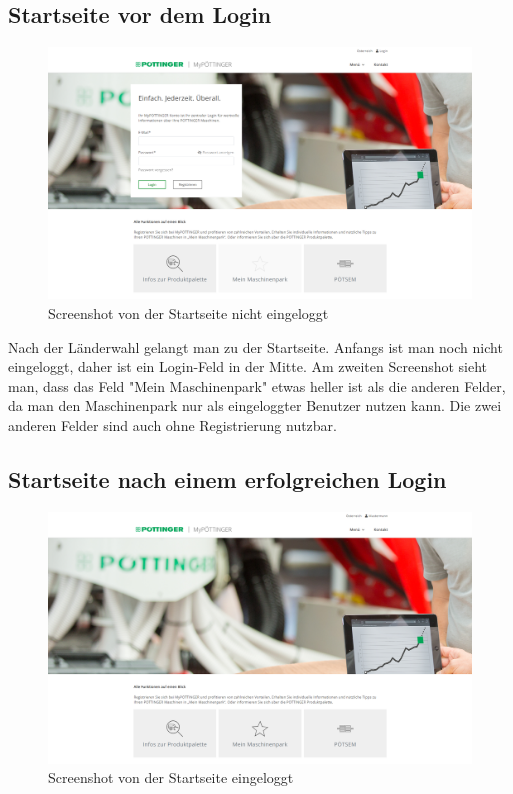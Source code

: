 \subsection{Startseite vor dem Login}
\begin{figure}[H]
	\centerline{
		\includegraphics[width=1\textwidth]{./grafiken/erm_home_not_logged_in_1.png}
	}
	\vskip0pt
	\caption{Screenshot von der Startseite nicht eingeloggt} \label{fig:homeNotLoggedIn}
\end{figure}

Nach der Länderwahl gelangt man zu der Startseite. Anfangs ist man noch nicht eingeloggt, daher ist ein Login-Feld in der Mitte. Am zweiten Screenshot sieht man, dass das Feld "Mein Maschinenpark" etwas heller ist als die anderen Felder, da man den Maschinenpark nur als eingeloggter Benutzer nutzen kann. Die zwei anderen Felder sind auch ohne Registrierung nutzbar.
 
\subsection{Startseite nach einem erfolgreichen Login}
\begin{figure}[H]
	\centerline{
		\includegraphics[width=1\textwidth]{./grafiken/erm_home_logged_in.png}
	}
	\vskip0pt
	\caption{Screenshot von der Startseite eingeloggt} \label{fig:homeLoggedIn}
\end{figure}


